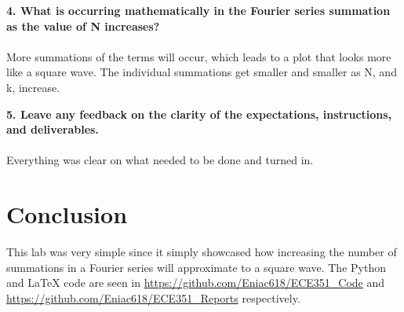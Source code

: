 \documentclass[12pt]{report}
\begin{document}
\textbf{4. What is occurring mathematically in the Fourier series summation as the value of N increases?} \\ \\
More summations of the terms will occur, which leads to a plot that looks more like a square wave. The individual summations get smaller and smaller as N, and k, increase.

\textbf{5. Leave any feedback on the clarity of the expectations, instructions, and deliverables.} \\ \\
Everything was clear on what needed to be done and turned in.

\section{Conclusion}
This lab was very simple since it simply showcased how increasing the number of summations in a Fourier series will approximate to a square wave. The Python and \LaTeX{} code are seen in \url{https://github.com/Eniac618/ECE351_Code} and \url{https://github.com/Eniac618/ECE351_Reports} respectively.
\end{document}
